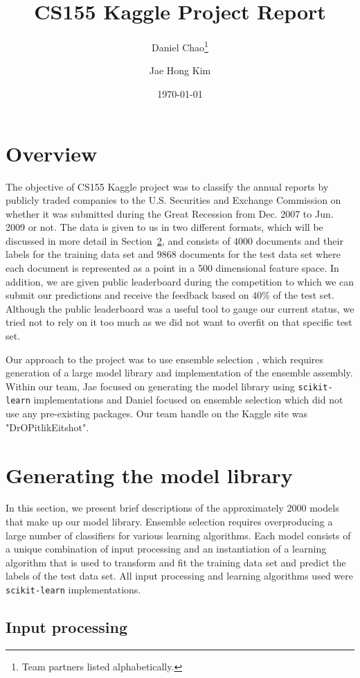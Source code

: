 \documentclass{article}
\title{CS155 Kaggle Project Report}
\author{Daniel Chao\thanks{Team partners listed alphabetically.} \and Jae Hong Kim\footnotemark[1]}
\date{\today}
\renewcommand{\(}{\left(}
\renewcommand{\)}{\right)}
\begin{document}
\maketitle 
\tableofcontents 

\section{Overview}
The objective of CS155 Kaggle project was to classify the annual reports by publicly traded companies to the U.S. Securities and Exchange Commission on whether it was submitted during the Great Recession from Dec. 2007 to Jun. 2009 or not.  The data is given to us in two different formats, which will be discussed in more detail in Section~\ref{sec:models}, and consists of 4000 documents and their labels for the training data set and 9868 documents for the test data set where each document is represented as a point in a 500 dimensional feature space.  In addition, we are given public leaderboard during the competition to which we can submit our predictions and receive the feedback based on $40\%$ of the test set.  Although the public leaderboard was a useful tool to gauge our current status, we tried not to rely on it too much as we did not want to overfit on that specific test set.  

Our approach to the project was to use ensemble selection \cite{caruana04}, which requires generation of a large model library and implementation of the ensemble assembly.  Within our team, Jae focused on generating the model library using \texttt{scikit-learn} implementations and Daniel focused on ensemble selection which did not use any pre-existing packages.  Our team handle on the Kaggle site was "DrOPitlikEitshot".

\section{Generating the model library} \label{sec:models}
In this section, we present brief descriptions of the approximately 2000 models that make up our model library.  Ensemble selection requires overproducing a large number of classifiers for various learning algorithms.  Each model consists of a unique combination of input processing and an instantiation of a learning algorithm that is used to transform and fit the training data set and predict the labels of the test data set.  All input processing and learning algorithms used were \texttt{scikit-learn} implementations.  

  \subsection{Input processing}
\end{document}
